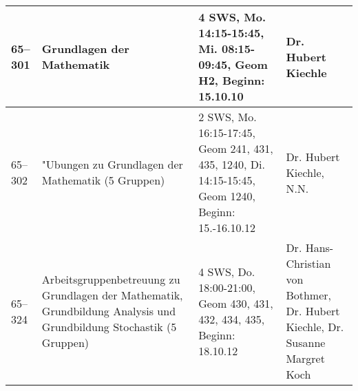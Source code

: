 \begin{tabularx}{\textwidth}{|l|X|X|X|}
\hline 65--301 	& Grundlagen der Mathematik
			& 4 SWS, Mo. 14:15-15:45, Mi. 08:15-09:45, Geom H2, Beginn: 15.10.10
			& Dr. Hubert Kiechle \\
\hline 65--302 & "Ubungen zu Grundlagen der Mathematik (5 Gruppen)
			& 2 SWS, Mo. 16:15-17:45, Geom 241, 431, 435, 1240, Di. 14:15-15:45, Geom 1240, Beginn: 15.-16.10.12
			& Dr. Hubert Kiechle, N.N. \\
\hline 65--324 & Arbeitsgruppenbetreuung zu Grundlagen der Mathematik, Grundbildung Analysis und Grundbildung Stochastik (5 Gruppen)
			& 4 SWS, Do. 18:00-21:00, Geom 430, 431, 432, 434, 435, Beginn: 18.10.12
			& Dr. Hans-Christian von Bothmer, Dr. Hubert Kiechle, Dr. Susanne Margret Koch \\
%


\end{tabularx}
